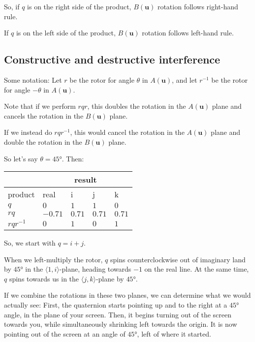 \documentclass[12pt]{article}
\begin{document}
	So, if $q$ is on the right side of the product, $B(\mathbf{u})$ rotation follows right-hand rule.
	
	If $q$ is on the left side of the product, $B(\mathbf{u})$ rotation follows left-hand rule.
	
	\subsection{Constructive and destructive interference}
	
	Some notation: Let $r$ be the rotor for angle $\theta$ in $A(\mathbf{u})$, and let $r^{-1}$ be the rotor for angle $-\theta$ in $A(\mathbf{u})$.
	
	Note that if we perform $rqr$, this doubles the rotation in the $A(\mathbf{u})$ plane and cancels the rotation in the $B(\mathbf{u})$ plane.
	
	If we instead do $rqr^{-1}$, this would cancel the rotation in the $A(\mathbf{u})$ plane and double the rotation in the $B(\mathbf{u})$ plane.
	
	So let's say $\theta = 45\si{\degree}$. Then:

	\begin{tabular}{|p{1.5cm} | p{1.1cm} | p{1.1cm} | p{1.1cm} | p{1.1cm}|}
		\hline
		 &  \multicolumn{4}{c}{result} \\ 
 		\hline
 		product   & real & i & j & k\\
 		\hline
 		$q$       & $0    $ & $1   $ & $1   $ & $0   $\\ \hline
		$rq$      & $-0.71$ & $0.71$ & $0.71$ & $0.71$\\ \hline
		$rqr^{-1}$& $0    $ & $1   $ & $0   $ & $1   $\\ \hline
	\end{tabular}
	
 	So, we start with $q = i + j$.
 	
 	When we left-multiply the rotor, $q$ spins counterclockwise out of imaginary land by $45\si{\degree}$ in the $\langle 1, i \rangle$-plane, heading towards $-1$ on the real line. 
 	At the same time, $q$ spins towards us in the $\langle j, k \rangle$-plane by $45 \si{\degree}$. 
 	
 	If we combine the rotations in these two planes, we can determine what we would actually see: 
 	First, the quaternion starts pointing up and to the right at a $45\si{\degree}$ angle, in the plane of your screen. 
 	Then, it begins turning out of the screen towards you, while simultaneously shrinking left towards the origin. 
 	It is now pointing out of the screen at an angle of $45\si{\degree}$, left of where it started.
 	
\end{document}
